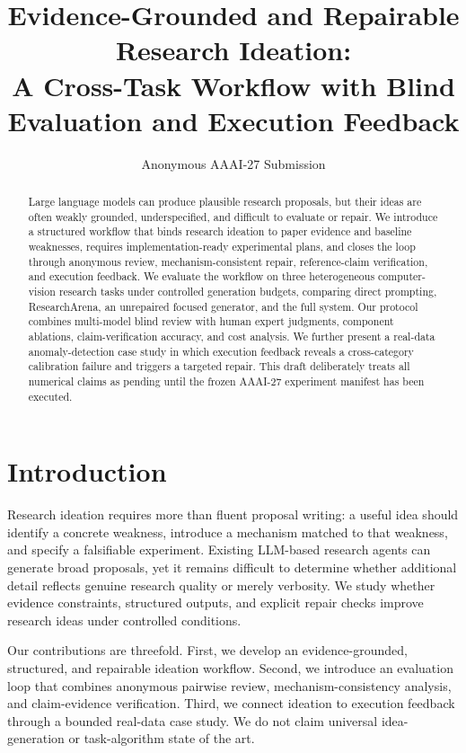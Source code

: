 \documentclass[letterpaper]{article}
\title{Evidence-Grounded and Repairable Research Ideation:\\
A Cross-Task Workflow with Blind Evaluation and Execution Feedback}
\author{Anonymous AAAI-27 Submission}
\begin{document}
\maketitle

\begin{abstract}
Large language models can produce plausible research proposals, but their ideas are often weakly grounded, underspecified, and difficult to evaluate or repair. We introduce a structured workflow that binds research ideation to paper evidence and baseline weaknesses, requires implementation-ready experimental plans, and closes the loop through anonymous review, mechanism-consistent repair, reference-claim verification, and execution feedback. We evaluate the workflow on three heterogeneous computer-vision research tasks under controlled generation budgets, comparing direct prompting, ResearchArena, an unrepaired focused generator, and the full system. Our protocol combines multi-model blind review with human expert judgments, component ablations, claim-verification accuracy, and cost analysis. We further present a real-data anomaly-detection case study in which execution feedback reveals a cross-category calibration failure and triggers a targeted repair. This draft deliberately treats all numerical claims as pending until the frozen AAAI-27 experiment manifest has been executed.
\end{abstract}

\section{Introduction}
Research ideation requires more than fluent proposal writing: a useful idea should identify a concrete weakness, introduce a mechanism matched to that weakness, and specify a falsifiable experiment. Existing LLM-based research agents can generate broad proposals, yet it remains difficult to determine whether additional detail reflects genuine research quality or merely verbosity. We study whether evidence constraints, structured outputs, and explicit repair checks improve research ideas under controlled conditions.

Our contributions are threefold. First, we develop an evidence-grounded, structured, and repairable ideation workflow. Second, we introduce an evaluation loop that combines anonymous pairwise review, mechanism-consistency analysis, and claim-evidence verification. Third, we connect ideation to execution feedback through a bounded real-data case study. We do not claim universal idea-generation or task-algorithm state of the art.
\end{document}

